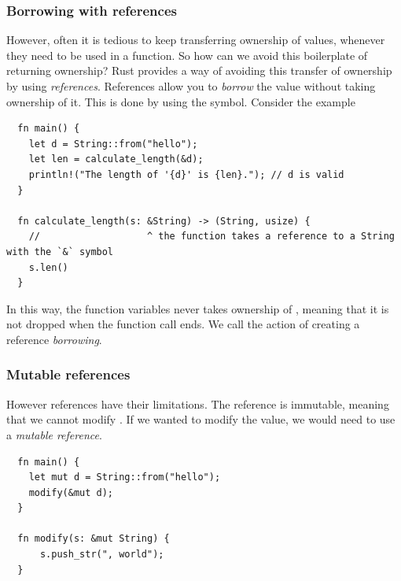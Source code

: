 \documentclass[11pt]{report}
\theoremstyle{definition}
\theoremstyle{plain}
\begin{document}
\subsubsection{Borrowing with references}
However, often it is tedious to keep transferring ownership of values, whenever they need to be used in a function. So how can we avoid this boilerplate of returning ownership? Rust provides a way of avoiding this transfer of ownership by using \textit{references}. References allow you to \textit{borrow} the value without taking ownership of it. This is done by using the \rust{&} symbol. Consider the example
\begin{verbatim}
  fn main() {
    let d = String::from("hello");
    let len = calculate_length(&d);
    println!("The length of '{d}' is {len}."); // d is valid
  }

  fn calculate_length(s: &String) -> (String, usize) {
    //                   ^ the function takes a reference to a String with the `&` symbol
    s.len()
  }
\end{verbatim}

In this way, the function variables  never takes ownership of , meaning that it is not dropped when the function call ends. We call the action of creating a reference \textit{borrowing}.

\subsubsection{Mutable references}
However references have their limitations. The reference is immutable, meaning that we cannot modify . If we wanted to modify the value, we would need to use a \textit{mutable reference}.

\begin{verbatim}
  fn main() {
    let mut d = String::from("hello");
    modify(&mut d);
  }
  
  fn modify(s: &mut String) {
      s.push_str(", world");
  }
 \end{verbatim}
\end{document}
